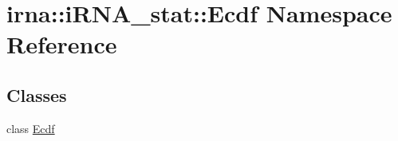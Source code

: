 \hypertarget{namespaceirna_1_1iRNA__stat_1_1Ecdf}{
\section{irna\-:\-:i\-R\-N\-A\-\_\-stat\-:\-:\-Ecdf \-Namespace \-Reference}
\label{namespaceirna_1_1iRNA__stat_1_1Ecdf}
}
\subsection*{\-Classes}
\begin{DoxyCompactItemize}
\item 
class \hyperlink{classirna_1_1iRNA__stat_1_1Ecdf_1_1Ecdf}{\-Ecdf}
\end{DoxyCompactItemize}
